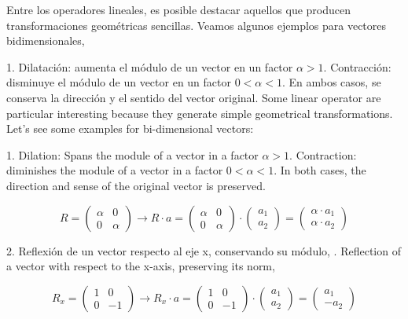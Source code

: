 \begin{paracol}{2}
Entre los operadores lineales, es posible destacar aquellos que producen transformaciones geométricas sencillas. Veamos algunos ejemplos para vectores bidimensionales,

1. Dilatación: aumenta el módulo de un vector en un factor $\alpha>1$. Contracción: disminuye el módulo de un vector en un factor $0<\alpha<1$. En ambos casos, se conserva la dirección y el sentido del vector original.
\switchcolumn
Some linear operator are particular interesting because they generate simple geometrical transformations. Let's see some examples for bi-dimensional vectors:

1. Dilation: Spans the module of a vector in a factor $\alpha>1$. Contraction: diminishes the module of a vector in a factor $0<\alpha<1$. In both cases, the direction and sense of the original vector is preserved.
\end{paracol} 
\begin{equation*}
R=\begin{pmatrix}
\alpha& 0\\
0& \alpha
\end{pmatrix} \rightarrow R\cdot a = \begin{pmatrix}
\alpha& 0\\
0& \alpha
\end{pmatrix} \cdot \begin{pmatrix}
a_1\\
a_2
\end{pmatrix}= \begin{pmatrix}
\alpha \cdot a_1\\
\alpha \cdot a_2
\end{pmatrix}
\end{equation*}
\begin{paracol}{2}
2. Reflexión de un vector respecto al eje x, conservando su módulo,
. Reflection of a vector with respect to the x-axis, preserving its norm,
\end{paracol}
\begin{equation*}
R_x=\begin{pmatrix}
1& 0\\
0& -1
\end{pmatrix} \rightarrow R_x\cdot a = \begin{pmatrix}
1& 0\\
0& -1
\end{pmatrix} \cdot \begin{pmatrix}
a_1\\
a_2
\end{pmatrix}= \begin{pmatrix}
a_1\\
-a_2
\end{pmatrix}
\end{equation*}
